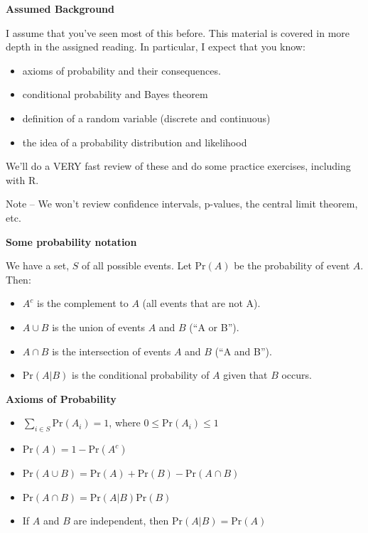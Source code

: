 \documentclass[12pt,xcolor=svgnames]{beamer}
\newcommand{\bl}{\color{blue}}
\newcommand{\theme}{\color{FireBrick}}
\newcommand{\sk}{\vspace{.4cm}}
\newcommand{\chap}[1]{{\theme \Large \bf #1} \sk}
\newcommand{\pr}{\text{Pr}}
\begin{document}


\begin{frame}
\chap{Assumed Background} 

I assume that you've seen most of this before. This material is covered in more depth in the assigned reading. In particular, I expect that you know:

\begin{itemize}
\item axioms of probability and their consequences.
\item conditional probability and Bayes theorem
\item definition of a random variable (discrete and continuous)
\item the idea of a probability distribution and likelihood
\end{itemize}

We'll do a VERY fast review of these and do some practice exercises, including with {\sf R}.

Note -- We won't review confidence intervals, p-values, the central limit theorem, etc.

\end{frame}

\begin{frame}
\chap{Some probability notation} 

We have a {\bl set}, $S$ of all possible events. Let $\pr(A)$ be the probability of event $A$. Then:

\begin{itemize}
\item $A^c$ is the complement to $A$ (all events that are not A). 
\item $A \cup B$ is the union of events $A$ and $B$ (``A or B''). 
\item $A \cap B$ is the intersection of events $A$ and $B$ (``A and B'').
\item $\pr(A|B)$ is the conditional probability of $A$ given that $B$ occurs.  
\end{itemize}
\end{frame}


\begin{frame}
\chap{Axioms of Probability} 


\begin{itemize}
\item $\sum_{i \in S} \pr(A_i)=1$, where $0 \leq \pr(A_i) \leq 1$
\item $\pr(A)=1-\pr(A^c)$
\item $\pr(A \cup B) = \pr(A) + \pr(B) -\pr(A \cap B)$
\item $\pr(A \cap B) = \pr(A|B)\pr(B)$
\item If $A$ and $B$ are {\bl independent}, then $\pr(A|B) = \pr(A)$
\end{itemize}

\end{frame}
\end{document}
